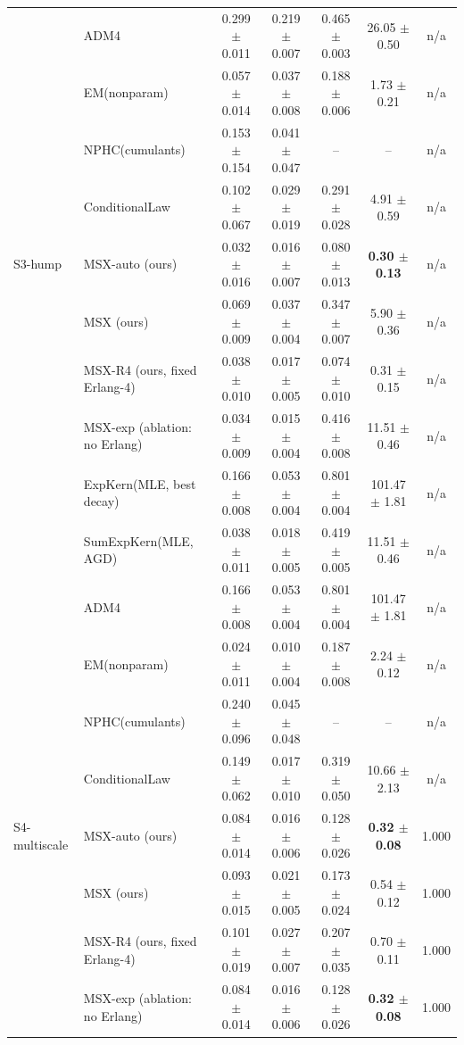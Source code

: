 \begin{tabular}{llccccc}
 & ADM4 & 0.299 $\pm$ 0.011 & 0.219 $\pm$ 0.007 & 0.465 $\pm$ 0.003 & 26.05 $\pm$ 0.50 & n/a \\
 & EM(nonparam) & 0.057 $\pm$ 0.014 & 0.037 $\pm$ 0.008 & 0.188 $\pm$ 0.006 & 1.73 $\pm$ 0.21 & n/a \\
 & NPHC(cumulants) & 0.153 $\pm$ 0.154 & 0.041 $\pm$ 0.047 & -- & -- & n/a \\
 & ConditionalLaw & 0.102 $\pm$ 0.067 & 0.029 $\pm$ 0.019 & 0.291 $\pm$ 0.028 & 4.91 $\pm$ 0.59 & n/a \\
\midrule
S3-hump & MSX-auto (ours) & 0.032 $\pm$ 0.016 & 0.016 $\pm$ 0.007 & 0.080 $\pm$ 0.013 & \textbf{0.30 $\pm$ 0.13} & n/a \\
 & MSX (ours) & 0.069 $\pm$ 0.009 & 0.037 $\pm$ 0.004 & 0.347 $\pm$ 0.007 & 5.90 $\pm$ 0.36 & n/a \\
 & MSX-R4 (ours, fixed Erlang-4) & 0.038 $\pm$ 0.010 & 0.017 $\pm$ 0.005 & 0.074 $\pm$ 0.010 & 0.31 $\pm$ 0.15 & n/a \\
 & MSX-exp (ablation: no Erlang) & 0.034 $\pm$ 0.009 & 0.015 $\pm$ 0.004 & 0.416 $\pm$ 0.008 & 11.51 $\pm$ 0.46 & n/a \\
 & ExpKern(MLE, best decay) & 0.166 $\pm$ 0.008 & 0.053 $\pm$ 0.004 & 0.801 $\pm$ 0.004 & 101.47 $\pm$ 1.81 & n/a \\
 & SumExpKern(MLE, AGD) & 0.038 $\pm$ 0.011 & 0.018 $\pm$ 0.005 & 0.419 $\pm$ 0.005 & 11.51 $\pm$ 0.46 & n/a \\
 & ADM4 & 0.166 $\pm$ 0.008 & 0.053 $\pm$ 0.004 & 0.801 $\pm$ 0.004 & 101.47 $\pm$ 1.81 & n/a \\
 & EM(nonparam) & 0.024 $\pm$ 0.011 & 0.010 $\pm$ 0.004 & 0.187 $\pm$ 0.008 & 2.24 $\pm$ 0.12 & n/a \\
 & NPHC(cumulants) & 0.240 $\pm$ 0.096 & 0.045 $\pm$ 0.048 & -- & -- & n/a \\
 & ConditionalLaw & 0.149 $\pm$ 0.062 & 0.017 $\pm$ 0.010 & 0.319 $\pm$ 0.050 & 10.66 $\pm$ 2.13 & n/a \\
\midrule
S4-multiscale & MSX-auto (ours) & 0.084 $\pm$ 0.014 & 0.016 $\pm$ 0.006 & 0.128 $\pm$ 0.026 & \textbf{0.32 $\pm$ 0.08} & 1.000 \\
 & MSX (ours) & 0.093 $\pm$ 0.015 & 0.021 $\pm$ 0.005 & 0.173 $\pm$ 0.024 & 0.54 $\pm$ 0.12 & 1.000 \\
 & MSX-R4 (ours, fixed Erlang-4) & 0.101 $\pm$ 0.019 & 0.027 $\pm$ 0.007 & 0.207 $\pm$ 0.035 & 0.70 $\pm$ 0.11 & 1.000 \\
 & MSX-exp (ablation: no Erlang) & 0.084 $\pm$ 0.014 & 0.016 $\pm$ 0.006 & 0.128 $\pm$ 0.026 & \textbf{0.32 $\pm$ 0.08} & 1.000 \\

\end{tabular}
